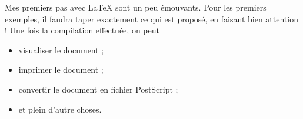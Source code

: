 \documentclass[a4paper]{article}
\begin{document}
Mes premiers pas avec \LaTeX{} sont un peu \'emouvants. Pour les premiers
exemples, il faudra taper exactement ce qui est propos\'e, en faisant bien
attention ! Une fois la compilation effectu\'ee, on peut
\begin{itemize}
\item visualiser le document ;
\item imprimer le document ;
\item convertir le document en fichier PostScript ;
\item et plein d'autre choses.
\end{itemize}
\end{document}
